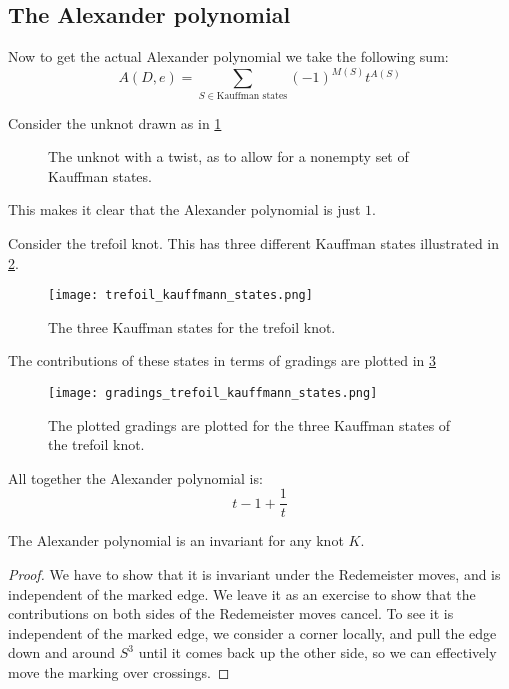 \documentclass{amsproc}
\begin{document}
\subsection{The Alexander polynomial}

Now to get the actual Alexander polynomial we take the following sum:
\begin{equation}
A\left( D , e \right) = 
\sum_{S\in \text{Kauffman states}}
\left( -1 \right)^{M\left( S \right)} t^{A\left( S \right)} 
\end{equation}

\begin{exm}
Consider the unknot drawn as in \cref{fig:unknot_twisted}
\begin{figure}
\caption{The unknot with a twist, as to allow for a nonempty set of
Kauffman states.}
\label{fig:unknot_twisted}
\end{figure}
This makes it clear that the Alexander polynomial is just $1$.
\end{exm}

\begin{exm}
Consider the trefoil knot. This has three different Kauffman states illustrated in
\cref{fig:trefoil_kauffman}.
\begin{figure}
\texttt{[image: trefoil\_kauffmann\_states.png]}
\caption{The three Kauffman states for the trefoil knot.}
\label{fig:trefoil_kauffman}
\end{figure}
The contributions of these states in terms of gradings are plotted in 
\cref{fig:trefoil_gradings}
\begin{figure}
\texttt{[image: gradings\_trefoil\_kauffmann\_states.png]}
\caption{The plotted gradings are plotted for the three Kauffman states of
the trefoil knot.}
\label{fig:trefoil_gradings}
\end{figure}
All together the Alexander polynomial is:
\begin{equation}
t - 1 + \frac{1}{t}
\end{equation}
\end{exm}

\begin{thm}
The Alexander polynomial is an invariant for any knot $K$. 
\end{thm}

\begin{proof}
We have to show that it is invariant under the Redemeister moves, and is independent of 
the marked edge. 
We leave it as an exercise to show that the contributions on both sides of the Redemeister moves
cancel.
To see it is independent of the marked edge, we consider a corner locally, and pull the edge
down and around $S^3$ until it comes back up the other side, so we can effectively move the marking
over crossings. 
\end{proof}
\end{document}
